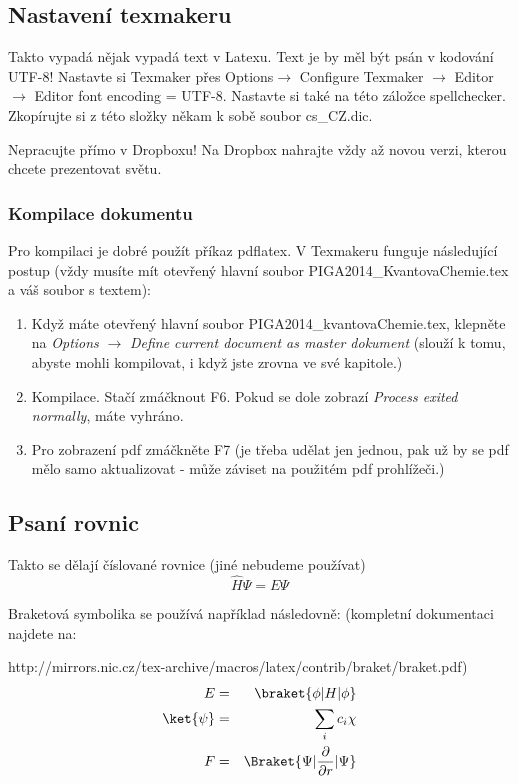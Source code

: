 \subsection{Nastavení texmakeru}
Takto vypadá nějak vypadá text v Latexu. Text je by měl být psán v kodování UTF-8! 
Nastavte si Texmaker přes Options$\rightarrow$ Configure Texmaker $\rightarrow$ Editor $\rightarrow$ Editor font encoding = UTF-8. 
Nastavte si také na této záložce spellchecker. Zkopírujte si z této složky někam k sobě soubor cs\_CZ.dic.

Nepracujte přímo v Dropboxu! Na Dropbox nahrajte vždy až novou verzi, kterou chcete prezentovat světu.


\subsubsection{Kompilace dokumentu}
Pro kompilaci je dobré použít příkaz pdflatex. V Texmakeru funguje následující postup (vždy musíte mít otevřený hlavní soubor PIGA2014\_KvantovaChemie.tex a váš soubor s textem):
\begin{enumerate}
\item Když máte otevřený hlavní soubor PIGA2014\_kvantovaChemie.tex, klepněte na \textit{Options}  $\rightarrow$ \textit{Define current document as master dokument} (slouží k tomu, abyste mohli kompilovat, i když jste zrovna ve své kapitole.)
\item Kompilace. Stačí zmáčknout F6. Pokud se dole zobrazí \textit{Process exited normally}, máte vyhráno.
\item Pro zobrazení pdf zmáčkněte F7 (je třeba udělat jen jednou, pak už by se pdf mělo samo aktualizovat - může záviset na použitém pdf prohlížeči.)
\end{enumerate}

\subsection{Psaní rovnic}

Takto se dělají číslované rovnice (jiné nebudeme používat)
\begin{equation}
\hat{H}\Psi=E\Psi
\label{rov:esch}
\end{equation}

\noindent  %
Braketová symbolika se používá například následovně:
(kompletní dokumentaci najdete na:

\noindent
http://mirrors.nic.cz/tex-archive/macros/latex/contrib/braket/braket.pdf)
\begin{eqnarray}
E&=&\braket{\phi|H|\phi} \\
\ket{\psi}&=&\sum_i c_i \chi \\
F&=&\Braket{\Psi|\frac{\partial}{\partial r}|\Psi}
\end{eqnarray}

